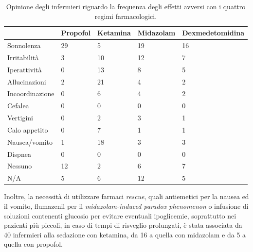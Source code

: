 \bgroup
\def\arraystretch{1.5}
\begin{table}[!h]
    \centering
    \begin{tabular}{p{} p{} p{} p{} p{}}
  & \footnotesize{Propofol} & \footnotesize{Ketamina} & \footnotesize{Midazolam} & \footnotesize{Dexmedetomidina}\\ \hline
    \footnotesize{Sonnolenza} & \footnotesize29 & \footnotesize5 & \footnotesize19 & \footnotesize16\\ \hline
    \footnotesize{Irritabilità} & \footnotesize3 & \footnotesize10 & \footnotesize12 & \footnotesize7\\ \hline
    \footnotesize{Iperattività} & \footnotesize0 & \footnotesize13 & \footnotesize8 & \footnotesize5\\ \hline
    \footnotesize{Allucinazioni} & \footnotesize2 & \footnotesize21 & \footnotesize4 & \footnotesize2\\ \hline
    \footnotesize{Incoordinazione} & \footnotesize0 & \footnotesize6 & \footnotesize4 & \footnotesize2\\ \hline
    \footnotesize{Cefalea} & \footnotesize0 & \footnotesize0 & \footnotesize0 & \footnotesize0\\ \hline
    \footnotesize{Vertigini}  & \footnotesize0 & \footnotesize2 & \footnotesize3 & \footnotesize1\\ \hline
    \footnotesize{Calo appetito} & \footnotesize0 & \footnotesize7 & \footnotesize1 & \footnotesize1\\ \hline
    \footnotesize{Nausea/vomito} & \footnotesize1 & \footnotesize18 & \footnotesize3 & \footnotesize3\\ \hline
    \footnotesize{Dispnea} & \footnotesize0 & \footnotesize0 & \footnotesize0 & \footnotesize0\\ \hline
    \footnotesize{Nessuno} & \footnotesize12 & \footnotesize2 & \footnotesize6 & \footnotesize7\\ \hline
    \footnotesize{N/A} & \footnotesize5 & \footnotesize6 & \footnotesize12 & \footnotesize5\\ 

    \end{tabular}
    \caption{Opinione degli infermieri riguardo la frequenza degli effetti avversi con i quattro regimi farmacologici.}
    \label{tab:effavv}
\end{table}
\egroup

Inoltre, la necessità di utilizzare farmaci \emph{rescue}, quali antiemetici per la nausea ed il vomito, flumazenil per il \emph{midazolam-induced paradox phenomenon} o infusione di soluzioni contenenti glucosio per evitare eventuali ipoglicemie, soprattutto nei pazienti più piccoli, in caso di tempi di risveglio prolungati, è stata associata da 40 infermieri alla sedazione con ketamina, da 16 a quella con midazolam e da 5 a quella con propofol.

